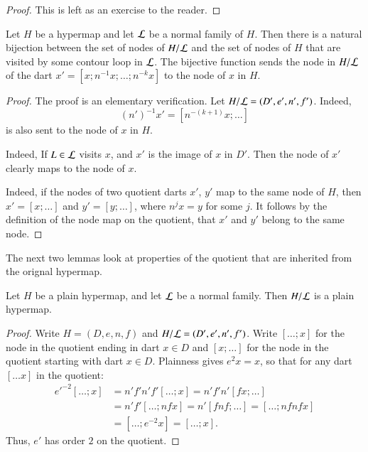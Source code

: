 \begin{proof}  This is left as an exercise to the reader.
\end{proof}


\begin{lemma}\label{lemma:quotient-node}
Let $H$ be a hypermap and let ${\cal L}$ be a normal family of $H$.
Then there is a natural bijection between  the set of nodes of
$H/{\cal L}$ and the set of nodes of $H$ that
are visited by some contour loop in ${\cal L}$.   
The bijective function sends the node in $H/{\cal L}$ of 
the dart $x' = [x;n^{-1} x;\ldots;n^{-k}x]$ to the node of $x$ in $H$.
\end{lemma}

\begin{proof}  The proof is an elementary verification.
Let $H/{\cal L} = (D',e',n',f')$.
  Indeed, 
 \begin{displaymath}
(n')^{-1} x' = [n^{-(k+1)} x;\ldots]
\end{displaymath}
 is also sent to the node of $x$ in $H$.

  Indeed,
If $L\in {\cal L}$ visits $x$,  and $x'$ is the image of $x$ in $D'$.
Then the node of $x'$ clearly maps to the node of $x$.  

  Indeed, if the nodes of
two quotient darts $x'$, $y'$ map to the same node of $H$, then
$x'=[x;\ldots]$ and $y'=[y;\ldots]$, where $n^j x = y$ for some $j$.
It follows by the definition of the node map on the quotient, that
$x'$ and $y'$ belong to the same node.
\end{proof}

The next two lemmas look at properties of the quotient that are
inherited from the orignal hypermap.

\begin{lemma}
Let $H$ be a plain hypermap, and let $\cal L$ be a
normal family.  Then $H/{\cal L}$ is a plain hypermap.
\end{lemma}

\begin{proof}  Write $H=(D,e,n,f)$ and $H/{\cal L} = (D',e',n',f')$.  
Write $[\ldots; x]$ for the node in
the quotient ending in dart $x\in D$ and $[x;\ldots]$ for the node
in the quotient starting with dart $x\in D$.  Plainness gives $e^2 x
= x$, so that for any dart $[\ldots x]$ in the quotient:
\begin{displaymath}\begin{array}{lll}
{e'}^{-2} [\ldots; x] &= n' f' n' f' [\ldots; x] = n' f' n' [f x; \ldots] \\&=
n' f' [\ldots; n f x] = n' [f n f; \ldots] = [\ldots; n f n f x]\\ &=
[\ldots; e^{-2} x] = [\ldots; x].
\end{array}\end{displaymath}
Thus, $e'$ has order $2$ on the quotient.
\end{proof}




